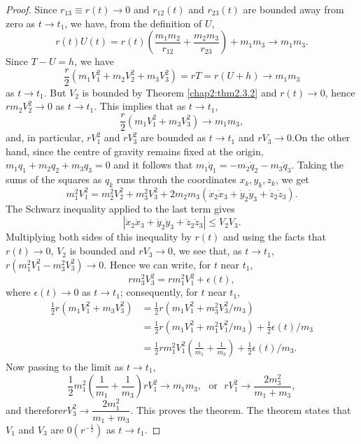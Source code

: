 \begin{proof}
Since $r_{13} \equiv r(t) \to 0$ and $r_{12} (t)$ and $r_{23} (t)$ are bounded away from zero as $t \to t_1$, we have, from the definition of $U$, 
$$
r(t) U(t) = r(t) \left(\frac{m_1 m_2}{r_{12}} + \frac{m_2m_3}{r_{23}} \right)  + m_1 m_3 \to m_1 m_3. 
$$
Since $T - U = h$, we have
$$
\frac{r}{2} (m_1 V^2_1 + m_2 V^2_2 + m_3 V^2_3) = rT = r(U+h) \to m_1 m_3
$$
as $t \to t_1$. But $V_2$ is bounded by Theorem \ref{chap2:thm2.3.2} and $r(t) \to 0$, hence $rm_2 V^2_2 \to 0$ as $t \to t_1$. This implies that as $t \to t_1$, 
$$
\frac{r}{2} (m_1 V^2_1 + m_3 V^2_3)  \to m_1 m_3,
$$
and, in particular, $rV^2_1$ and $rV^2_3$ are bounded as $t \to t_1$ and $rV_3 \to 0$.\pageoriginale On the other hand, since the centre of gravity remains fixed at the origin, $m_1q_1 + m_2 q_2 + m_3 q_3 = 0$ and it follows that $m_1 \dot{q}_1 = - m_2 \dot{q}_2 - m_3 \dot{q}_3$. Taking the sums of the squares as $q_k$ runs throuh the coordinates $x_k,y_k, z_k$, we get
$$
m^2_1 V^2_1  = m^2_2 V^2_2 + m^2_3 V^2_3 + 2m_2 m_3 (\dot{x}_2 \dot{x}_3+ \dot{y}_2 \dot{y}_3 + \dot{z}_2 \dot{z}_3).
$$
The Schwarz inequality applied to the last term gives
$$
|\dot{x}_2 \dot{x}_3 + \dot{y}_2 \dot{y}_3 + \dot{z}_2 \dot{z}_3| \leq V_2 V_3. 
$$
Multiplying both sides of this inequality by $r(t)$ and using the facts that $r(t) \to 0$, $V_2$ is bounded and $rV_3 \to 0$, we see that, as $t \to t_1$, $r(m^2_1 V^2_1 - m^2_3 V^2_3) \to 0$. Hence we can write, for $t$ near $t_1$, 
$$
r m^2_3 V^2_3  = rm^2_1 V^2_1 + \epsilon (t),
$$
where $\epsilon (t) \to 0$ as $t \to t_1$; consequently, for $t$ near $t_1$,
\begin{align*}
\frac{1}{2} r(m_1 V^2_1 + m_3 V^2_3) & = \frac{1}{2} r(m_1 V^2_1 + m^2_3 V^2_3/ m_3)\\
& = \frac{1}{2} r(m_1 V^2_1 + m^2_1 V^2_1 / m_3) + \frac{1}{2} \epsilon (t)/m_3\\
& = \frac{1}{2} r m^2_1 V^2_1 \left(\frac{1}{m_1} + \frac{1}{m_3} \right) + \frac{1}{2} \epsilon(t) / m_3. 
\end{align*}
Now passing to the limit as $t\to t_1$,
$$
\frac{1}{2} m^2_1 \left(\frac{1}{m_1} + \frac{1}{m_3} \right) rV^2_1 \to m_1 m_3, \text{~ or ~} rV^2_1 \to \frac{2m^2_3}{m_1+m_3}, 
$$
and therefore\pageoriginale $rV^2_3 \to \dfrac{2m^2_1}{m_1+m_3}$. This proves the theorem. The theorem states that $V_1$ and $V_3$ are $0(r^{-\frac{1}{2}})$ as $t \to t_1$. 
\end{proof}


